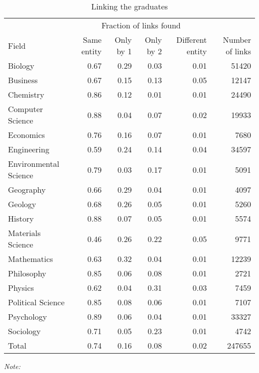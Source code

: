 \begin{table}

\caption{\label{tab:compare_linking_graduates}Linking the graduates}
\centering
\fontsize{9}{11}\selectfont
\begin{threeparttable}
\begin{tabular}[t]{lrrrrr}
\toprule
\multicolumn{1}{c}{ } & \multicolumn{4}{c}{Fraction of links found} & \multicolumn{1}{c}{ } \\
Field & Same entity & Only by 1 & Only by 2 & Different entity & Number of links\\
\midrule
Biology & 0.67 & 0.29 & 0.03 & 0.01 & 51420\\
Business & 0.67 & 0.15 & 0.13 & 0.05 & 12147\\
Chemistry & 0.86 & 0.12 & 0.01 & 0.01 & 24490\\
Computer Science & 0.88 & 0.04 & 0.07 & 0.02 & 19933\\
Economics & 0.76 & 0.16 & 0.07 & 0.01 & 7680\\
\addlinespace
Engineering & 0.59 & 0.24 & 0.14 & 0.04 & 34597\\
Environmental Science & 0.79 & 0.03 & 0.17 & 0.01 & 5091\\
Geography & 0.66 & 0.29 & 0.04 & 0.01 & 4097\\
Geology & 0.68 & 0.26 & 0.05 & 0.01 & 5260\\
History & 0.88 & 0.07 & 0.05 & 0.01 & 5574\\
\addlinespace
Materials Science & 0.46 & 0.26 & 0.22 & 0.05 & 9771\\
Mathematics & 0.63 & 0.32 & 0.04 & 0.01 & 12239\\
Philosophy & 0.85 & 0.06 & 0.08 & 0.01 & 2721\\
Physics & 0.62 & 0.04 & 0.31 & 0.03 & 7459\\
Political Science & 0.85 & 0.08 & 0.06 & 0.01 & 7107\\
\addlinespace
Psychology & 0.89 & 0.06 & 0.04 & 0.01 & 33327\\
Sociology & 0.71 & 0.05 & 0.23 & 0.01 & 4742\\
\midrule
Total & 0.74 & 0.16 & 0.08 & 0.02 & 247655\\
\bottomrule
\end{tabular}
\begin{tablenotes}[para]
\small
\item \textit{Note: } 

\end{tablenotes}
\end{threeparttable}
\end{table}
